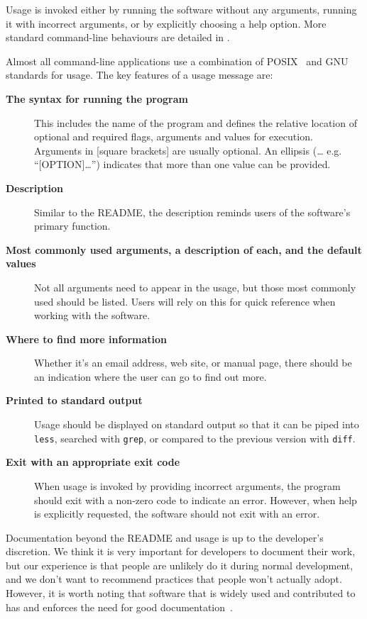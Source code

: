 \documentclass[10pt,letterpaper]{article}
\begin{document}
Usage is invoked either by running the software without
any arguments, running it with incorrect arguments, or by
explicitly choosing a help option.
More standard command-line behaviours are detailed in \cite{Seemann2013}.

Almost all command-line applications use a combination of
POSIX~\cite{posix2016} and GNU~\cite{gnustandards} standards for usage. 
The key features of a usage message are:

\begin{description}

\item[\textbf{The syntax for running the program}] This includes the
  name of the program and defines the relative location of optional
  and required flags, arguments and values for execution.  Arguments
  in {[}square brackets{]} are usually optional. An ellipsis (\ldots
  e.g. ``{[}OPTION{]}\ldots{}'') indicates that more than one value
  can be provided.

\item[\textbf{Description}] Similar to the README, the description
  reminds users of the software's primary function.

\item[\textbf{Most commonly used arguments, a description of each, and
    the default values}] Not all arguments need to appear in the
  usage, but those most commonly used should be listed. Users will
  rely on this for quick reference when working with the software.

\item[\textbf{Where to find more information}] Whether it's an email
  address, web site, or manual page, there should be an indication
  where the user can go to find out more.

\item[\textbf{Printed to standard output}] Usage should be displayed
  on standard output so that it can be piped into \texttt{less},
  searched with \texttt{grep}, or compared to the previous version
  with \texttt{diff}.

\item[\textbf{Exit with an appropriate exit code}] When usage is
  invoked by providing incorrect arguments, the program should exit
  with a non-zero code to indicate an error. However, when help is
  explicitly requested, the software should not exit with an error.

\end{description}

Documentation beyond the README and usage is up to the developer's discretion.
We think it is very important for developers to document their work, but our
experience is that people are unlikely do it during normal development, and we
don’t want to recommend practices that people won’t actually adopt. However, it
is worth noting that software that is widely used and contributed to has and
enforces the need for good documentation~\cite{gentleman2004}.
\end{document}
